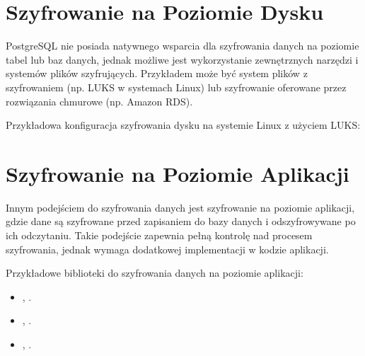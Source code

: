 \documentclass[letterpaper,10pt,polish]{sphinxmanual}
\begin{document}
\section{Szyfrowanie na Poziomie Dysku}
\label{\detokenize{sprawozdanie/source/rozdzialy/rozdzial5:szyfrowanie-na-poziomie-dysku}}
\sphinxAtStartPar
PostgreSQL nie posiada natywnego wsparcia dla szyfrowania danych na
poziomie tabel lub baz danych, jednak możliwe jest wykorzystanie
zewnętrznych narzędzi i systemów plików szyfrujących. Przykładem może
być system plików z szyfrowaniem (np. LUKS w systemach Linux) lub
szyfrowanie oferowane przez rozwiązania chmurowe (np. Amazon RDS).

\sphinxAtStartPar
Przykładowa konfiguracja szyfrowania dysku na systemie Linux z użyciem
LUKS:

\begin{sphinxVerbatim}[commandchars=\\\{\}]
   
    
  
   
\end{sphinxVerbatim}


\section{Szyfrowanie na Poziomie Aplikacji}
\label{\detokenize{sprawozdanie/source/rozdzialy/rozdzial5:szyfrowanie-na-poziomie-aplikacji}}
\sphinxAtStartPar
Innym podejściem do szyfrowania danych jest szyfrowanie na poziomie
aplikacji, gdzie dane są szyfrowane przed zapisaniem do bazy danych i
odszyfrowywane po ich odczytaniu. Takie podejście zapewnia pełną
kontrolę nad procesem szyfrowania, jednak wymaga dodatkowej
implementacji w kodzie aplikacji.

\sphinxAtStartPar
Przykładowe biblioteki do szyfrowania danych na poziomie aplikacji:
\begin{itemize}
\item {} 
\sphinxAtStartPar
{} \sphinxhyphen{} , .

\item {} 
\sphinxAtStartPar
{} \sphinxhyphen{} , .

\item {} 
\sphinxAtStartPar
{} \sphinxhyphen{} , .

\end{itemize}
\end{document}
